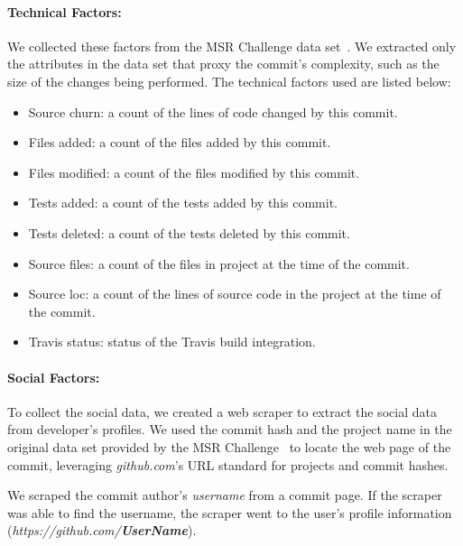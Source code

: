 \documentclass[10pt, conference]{IEEEtran}
\begin{document}
\paragraph{Technical Factors:} We collected these factors from the 
MSR Challenge data set~\cite{msr17challenge}.
We extracted only the attributes in the data set that proxy the commit's
complexity, such as the size of the changes being performed.  The technical
factors used are listed below:
\begin{itemize}
\item Source churn: a count of the lines of code changed by this commit.
\item Files added: a count of the files added by this commit.
\item Files modified: a count of the files modified by this commit.
\item Tests added: a count of the tests added by this commit.
\item Tests deleted: a count of the tests deleted by this commit.
\item Source files: a count of the files in project at the time of the commit.
\item Source loc: a count of the lines of source code in the project at
	the time of the commit.
\item Travis status: status of the Travis build integration.
\end{itemize}

\paragraph{Social Factors:} To collect the social data, we created a web scraper to extract the social data
from developer's profiles.
We used the commit hash and the project name in the original data
set provided by the MSR Challenge~\cite{msr17challenge} to locate the web page
of the commit, leveraging \textit{github.com}'s URL standard for projects and
commit hashes.

We scraped the commit author's
\textit{username} from a commit page. If the scraper was able to find the username, the
scraper went to the user's profile information
(\textit{https://github.com/\textbf{UserName}}). 
\end{document}
